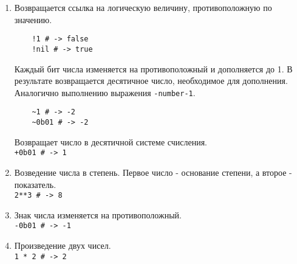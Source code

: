 \begin{enumerate} %

  \item %
  \begin{operator}
    Возвращается ссылка на логическую величину, противоположную по значению.
    \begin{verbatim}
    !1 # -> false
    !nil # -> true
    \end{verbatim}
  \end{operator}

  \begin{operator}
    Каждый бит числа изменяется на противоположный и дополняется до 1. В результате возвращается десятичное число, необходимое для дополнения. Аналогично выполнению выражения \verb!-number-1!.
    \begin{verbatim}
    ~1 # -> -2
    ~0b01 # -> -2
    \end{verbatim}
  \end{operator}

  \begin{operator}
    Возвращает число в десятичной системе счисления.
    \\\verb!+0b01 # -> 1!
  \end{operator}

  \item %
  \begin{operator}
    Возведение числа в степень. Первое число - основание степени, а второе - показатель.
    \\\verb!2**3 # -> 8!
  \end{operator}

  \item %
  \begin{operator}
    Знак числа изменяется на противоположный.
    \\\verb!-0b01 # -> -1!
  \end{operator}

  \item %
  \begin{operator}
    Произведение двух чисел.
    \\\verb!1 * 2 # -> 2!
  \end{operator}


\end{enumerate}
